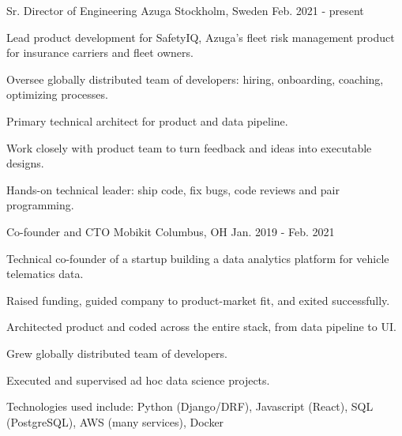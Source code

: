 

\begin{cventries}

  \cventry
    {Sr. Director of Engineering} %
    {Azuga} %
    {Stockholm, Sweden} %
    {Feb. 2021 - present} %
    {
      \begin{cvitems} %
        \item {Lead product development for SafetyIQ, Azuga's fleet risk management product for insurance carriers and fleet owners.}
        \item {Oversee globally distributed team of developers: hiring, onboarding, coaching, optimizing processes.}
        \item {Primary technical architect for product and data pipeline.}
        \item {Work closely with product team to turn feedback and ideas into executable designs.}
        \item {Hands-on technical leader: ship code, fix bugs, code reviews and pair programming.}
      \end{cvitems}
    }

  \cventry
    {Co-founder and CTO} %
    {Mobikit} %
    {Columbus, OH} %
    {Jan. 2019 - Feb. 2021} %
    {
      \begin{cvitems} %
        \item {Technical co-founder of a startup building a data analytics platform for vehicle telematics data.}
        \item {Raised funding, guided company to product-market fit, and exited successfully.}
        \item {Architected product and coded across the entire stack, from data pipeline to UI.}
        \item {Grew globally distributed team of developers.}
        \item {Executed and supervised ad hoc data science projects.}
        \item {Technologies used include: Python (Django/DRF), Javascript (React), SQL (PostgreSQL), AWS (many services), Docker}
      \end{cvitems}
    }


\end{cventries}
